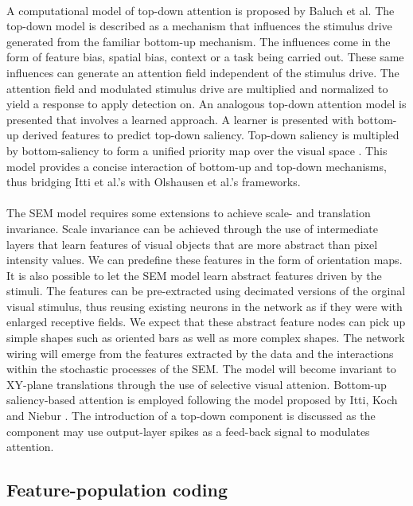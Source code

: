 \documentclass{report}
\begin{document}
\paragraph{}A computational model of top-down attention is proposed by Baluch et al. The top-down model is described as a mechanism that influences the stimulus drive generated from the familiar bottom-up mechanism. The influences come in the form of feature bias, spatial bias, context or a task being carried out. These same influences can generate an attention field independent of the stimulus drive. The attention field and modulated stimulus drive are multiplied and normalized to yield a response to apply detection on. An analogous top-down attention model is presented that involves a learned approach. A learner is presented with bottom-up derived features to predict top-down saliency. Top-down saliency is multipled by bottom-saliency to form a unified priority map over the visual space \cite{Baluch2011}. This model provides a concise interaction of bottom-up and top-down mechanisms, thus bridging Itti et al.'s with Olshausen et al.'s frameworks.

\paragraph{}The SEM model requires some extensions to achieve scale- and translation invariance. Scale invariance can be achieved through the use of intermediate layers that learn features of visual objects that are more abstract than pixel intensity values. We can predefine these features in the form of orientation maps. It is also possible to let the SEM model learn abstract features driven by the stimuli. The features can be pre-extracted using decimated versions of the orginal visual stimulus, thus reusing existing neurons in the network as if they were with enlarged receptive fields. We expect that these abstract feature nodes can pick up simple shapes such as oriented bars as well as more complex shapes. The network wiring will emerge from the features extracted by the data and the interactions within the stochastic processes of the SEM. The model will become invariant to XY-plane translations through the use of selective visual attenion. Bottom-up saliency-based attention is employed following the model proposed by Itti, Koch and Niebur \cite{Itti2000}. The introduction of a top-down component is discussed as the component may use output-layer spikes as a feed-back signal to modulates attention.

\subsection{Feature-population coding}
\end{document}

